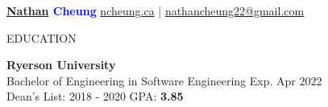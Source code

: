 \documentclass[letterpaper,11pt,oneside]{article}
\newcommand{\createHeading}[1]{
    \vspace{1.25em}
    \hline
    \vspace{-1.5ex}
    \begin{center}
        #1
    \end{center}
    \vspace{-1.5ex}
    \hline
    \vspace{1.25em}
}
\begin{document}

\noindent \huge{\textbf{\href{https://www.urbandictionary.com/define.php?term=Nathan}{Nathan} \textcolor{blue}{Cheung}}} \hfill \normalsize{ \href{https://ncheung.ca}{ncheung.ca} | \href{mailto:nathancheung22@gmail.com}{nathancheung22@gmail.com}}




\createHeading{EDUCATION}
\begin{addmargin}[.6em]{.6em}
    \textbf{Ryerson University} \\
    Bachelor of Engineering in Software Engineering \hfill Exp. Apr 2022 \\
    Dean's List: 2018 - 2020 \hfill GPA: \textbf{3.85}
\end{addmargin}
\end{document}
